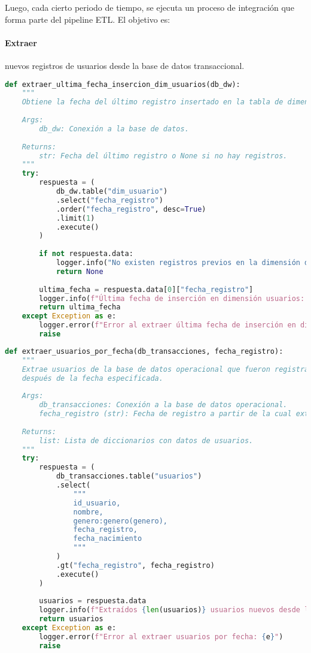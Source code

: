 Luego, cada cierto periodo de tiempo, se ejecuta un proceso de integración que forma parte del pipeline ETL. El objetivo es:

\paragraph{Extraer} nuevos registros de usuarios desde la base de datos transaccional.

\begin{lstlisting}[language=Python]
    def extraer_ultima_fecha_insercion_dim_usuarios(db_dw):
    """
    Obtiene la fecha del último registro insertado en la tabla de dimensión de usuarios.
    
    Args:
        db_dw: Conexión a la base de datos.
        
    Returns:
        str: Fecha del último registro o None si no hay registros.
    """
    try:
        respuesta = (
            db_dw.table("dim_usuario")
            .select("fecha_registro")
            .order("fecha_registro", desc=True)
            .limit(1)
            .execute()
        )
        
        if not respuesta.data:
            logger.info("No existen registros previos en la dimensión de usuarios.")
            return None
            
        ultima_fecha = respuesta.data[0]["fecha_registro"]
        logger.info(f"Última fecha de inserción en dimensión usuarios: {ultima_fecha}")
        return ultima_fecha
    except Exception as e:
        logger.error(f"Error al extraer última fecha de inserción en dim_usuario: {e}")
        raise
\end{lstlisting}

\begin{lstlisting}[language=Python]
    def extraer_usuarios_por_fecha(db_transacciones, fecha_registro):
    """
    Extrae usuarios de la base de datos operacional que fueron registrados
    después de la fecha especificada.
    
    Args:
        db_transacciones: Conexión a la base de datos operacional.
        fecha_registro (str): Fecha de registro a partir de la cual extraer usuarios.
        
    Returns:
        list: Lista de diccionarios con datos de usuarios.
    """
    try:
        respuesta = (
            db_transacciones.table("usuarios")
            .select(
                """
                id_usuario,
                nombre,
                genero:genero(genero),
                fecha_registro,
                fecha_nacimiento
                """
            )
            .gt("fecha_registro", fecha_registro)
            .execute()
        )
        
        usuarios = respuesta.data
        logger.info(f"Extraídos {len(usuarios)} usuarios nuevos desde la base operacional.")
        return usuarios
    except Exception as e:
        logger.error(f"Error al extraer usuarios por fecha: {e}")
        raise
\end{lstlisting}

